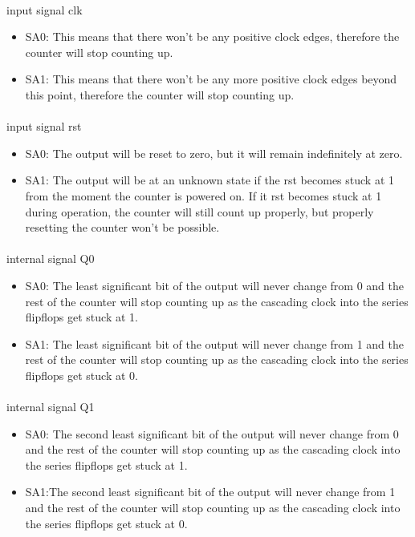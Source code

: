 \documentclass{article}
\begin{document}
	\paragraph{} input signal clk
	\begin{itemize}
		\item SA0: This means that there won’t be any positive clock edges, therefore the counter will stop counting up.
		\item SA1: This means that there won’t be any more positive clock edges beyond this point, therefore the counter will stop counting up. 
	\end{itemize}

	\paragraph{} input signal rst
	\begin{itemize}
		\item SA0: The output will be reset to zero, but it will remain indefinitely at zero.
		\item SA1: The output will be at an unknown state if the rst becomes stuck at 1 from the moment the counter is powered on. If it rst becomes stuck at 1 during operation, the counter will still count up properly, but properly resetting the counter won’t be possible.
	\end{itemize}

	\paragraph{} internal signal Q0
	\begin{itemize}
		\item SA0: The least significant bit of the output will never change from 0 and    the rest of the counter will stop counting up as the cascading clock into the series flipflops get stuck at 1.
		\item SA1: The least significant bit of the output will never change from 1 and the rest of the counter will stop counting up as the cascading clock into the series flipflops get stuck at 0. 
	\end{itemize}

	\paragraph{} internal signal Q1
	\begin{itemize}
		\item SA0: The second least significant bit of the output will never change from 0 and the rest of the counter will stop counting up as the cascading clock into the series flipflops get stuck at 1.
		\item SA1:The second least significant bit of the output will never change from 1 and the rest of the counter will stop counting up as the cascading clock into the series flipflops get stuck at 0. 
	\end{itemize}
\end{document}
